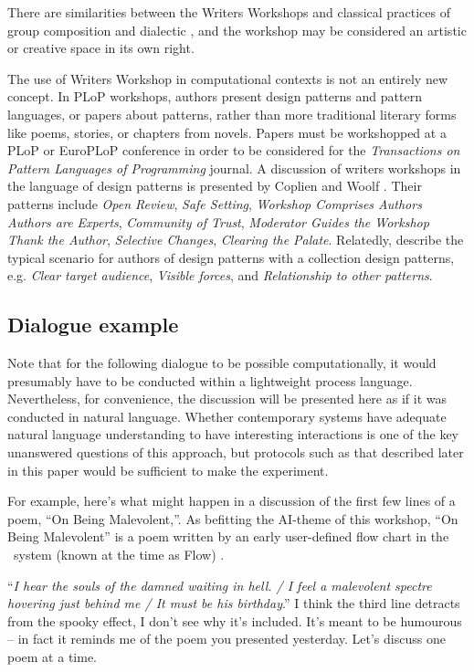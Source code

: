 There are similarities between the
Writers Workshops and classical practices of group composition
\cite{jin1975art} and dialectic \cite{dialectique}, and the workshop
may be considered an artistic or creative space in its own right.

The use of Writers Workshop in computational contexts is not an
entirely new concept. In PLoP workshops, authors present design
patterns and pattern languages, or papers about patterns, rather than
more traditional literary forms like poems, stories, or chapters from
novels.  Papers must be workshopped at a PLoP or EuroPLoP conference
in order to be considered for the \emph{Transactions on Pattern
  Languages of Programming} journal.  A discussion of writers
workshops in the language of design patterns is presented by Coplien
and Woolf \cite{coplien1997pattern}.  Their patterns include
\emph{Open Review}, \emph{Safe Setting}, \emph{Workshop Comprises
  Authors} \emph{Authors are Experts}, \emph{Community of Trust},
\emph{Moderator Guides the Workshop} \emph{Thank the Author},
\emph{Selective Changes}, \emph{Clearing the Palate}.
%
Relatedly,  describe the typical scenario
for authors of design patterns with a collection design patterns,
e.g. \emph{Clear target audience}, \emph{Visible forces}, and
\emph{Relationship to other patterns}.


\subsection{Dialogue example}
Note that for the following dialogue to be possible computationally,
it would presumably have to be conducted within a lightweight process
language.  Nevertheless, for convenience, the discussion will be
presented here as if it was conducted in natural language.  Whether
contemporary systems have adequate natural language understanding to
have interesting interactions is one of the key unanswered questions
of this approach, but protocols such as that described later in this
paper would be sufficient to make the experiment.

For example, here's what might happen in a discussion of the first few
lines of a poem, ``On Being Malevolent,''. As befitting the AI-theme
of this workshop, ``On Being Malevolent'' is a poem written by an
early user-defined flow chart in the \Fw\ system (known at the time as
{\sf Flow}) \cite{colton-flowcharting}.

\begin{center}
\begin{minipage}{.9\columnwidth}
\begin{dialogue}
 ``\emph{I hear the souls of the
  damned waiting in hell. / I feel a malevolent
  spectre hovering just behind me / It must be
  his birthday}.''
%
 I think the third line detracts
from the spooky effect, I don't see why it's
included.
%
 It's meant to be humourous -- in fact it reminds me
of the poem you presented yesterday.
%
 Let's discuss one poem at a
time.
\end{dialogue}
\end{minipage}
\end{center}


